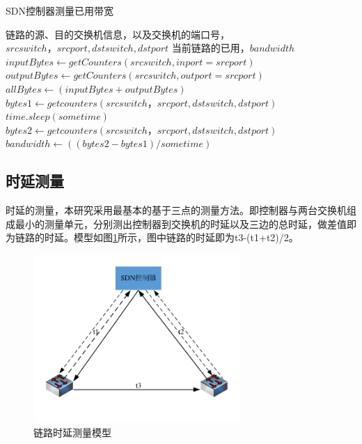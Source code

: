 \begin{algorithm}[!htb]
    \caption{SDN控制器测量已用带宽}
    \begin{algorithmic}[1] %
        \Require 链路的源、目的交换机信息，以及交换机的端口号，$srcswitch，srcport,dstswitch,dstport$
        \Ensure 当前链路的已用，$bandwidth$
        	\State $inputBytes \gets getCounters(srcswitch, inport=srcport)$
        	\State $outputBytes \gets getCounters(srcswitch, outport=srcport)$
        	\State $allBytes \gets (inputBytes+outputBytes)$
        	\State {}
        \EndFunction
        	\State $bytes1 \gets getcounters(srcswitch，srcport, dstswitch,dstport)$
        	\State $time.sleep(sometime)$
        	\State $bytes2 \gets getcounters(srcswitch，srcport, dstswitch,dstport)$
        	\State $bandwidth \gets ((bytes2-bytes1)/sometime)$
         	\State {}
        \EndFunction
    \end{algorithmic}
\end{algorithm}
\subsection{时延测量}
时延的测量，本研究采用最基本的基于三点的测量方法。即控制器与两台交换机组成最小的测量单元，分别测出控制器到交换机的时延以及三边的总时延，做差值即为链路的时延。模型如图\ref{fig:delay}所示，图中链路的时延即为t3-(t1+t2)/2。

\begin{figure}[!htb]
  \centering
  \includegraphics[width=0.7\textwidth]{logo/delay}
  \caption{链路时延测量模型}
  \label{fig:delay}
\end{figure}

